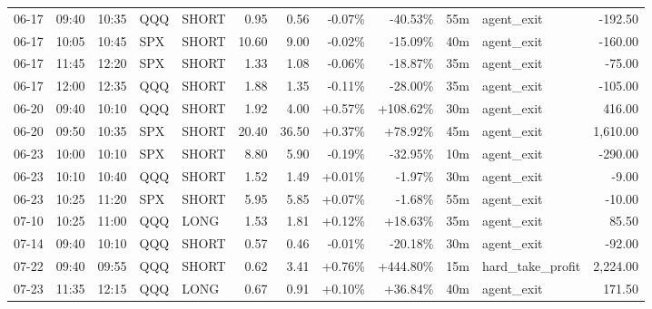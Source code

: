 \documentclass[11pt,a4paper,twoside]{article}
\begin{document}
\begin{center}
\begin{longtable}{>{\color{txtmain}}l l l l l r r r r r >{\color{txtmain}}l r}
06-17 & 09:40 & 10:35 & QQQ & SHORT & 0.95 & 0.56 & \textcolor{lossred}{-0.07\%} & \textcolor{lossred}{-40.53\%} & 55m & agent\_exit & \textcolor{lossred}{-192.50} \\
06-17 & 10:05 & 10:45 & SPX & SHORT & 10.60 & 9.00 & \textcolor{lossred}{-0.02\%} & \textcolor{lossred}{-15.09\%} & 40m & agent\_exit & \textcolor{lossred}{-160.00} \\
06-17 & 11:45 & 12:20 & SPX & SHORT & 1.33 & 1.08 & \textcolor{lossred}{-0.06\%} & \textcolor{lossred}{-18.87\%} & 35m & agent\_exit & \textcolor{lossred}{-75.00} \\
06-17 & 12:00 & 12:35 & QQQ & SHORT & 1.88 & 1.35 & \textcolor{lossred}{-0.11\%} & \textcolor{lossred}{-28.00\%} & 35m & agent\_exit & \textcolor{lossred}{-105.00} \\
06-20 & 09:40 & 10:10 & QQQ & SHORT & 1.92 & 4.00 & \textcolor{wingreen}{+0.57\%} & \textcolor{wingreen}{+108.62\%} & 30m & agent\_exit & \textcolor{wingreen}{416.00} \\
06-20 & 09:50 & 10:35 & SPX & SHORT & 20.40 & 36.50 & \textcolor{wingreen}{+0.37\%} & \textcolor{wingreen}{+78.92\%} & 45m & agent\_exit & \textcolor{wingreen}{1,610.00} \\
06-23 & 10:00 & 10:10 & SPX & SHORT & 8.80 & 5.90 & \textcolor{lossred}{-0.19\%} & \textcolor{lossred}{-32.95\%} & 10m & agent\_exit & \textcolor{lossred}{-290.00} \\
06-23 & 10:10 & 10:40 & QQQ & SHORT & 1.52 & 1.49 & \textcolor{wingreen}{+0.01\%} & \textcolor{lossred}{-1.97\%} & 30m & agent\_exit & \textcolor{lossred}{-9.00} \\
06-23 & 10:25 & 11:20 & SPX & SHORT & 5.95 & 5.85 & \textcolor{wingreen}{+0.07\%} & \textcolor{lossred}{-1.68\%} & 55m & agent\_exit & \textcolor{lossred}{-10.00} \\
07-10 & 10:25 & 11:00 & QQQ & LONG & 1.53 & 1.81 & \textcolor{wingreen}{+0.12\%} & \textcolor{wingreen}{+18.63\%} & 35m & agent\_exit & \textcolor{wingreen}{85.50} \\
07-14 & 09:40 & 10:10 & QQQ & SHORT & 0.57 & 0.46 & \textcolor{lossred}{-0.01\%} & \textcolor{lossred}{-20.18\%} & 30m & agent\_exit & \textcolor{lossred}{-92.00} \\
07-22 & 09:40 & 09:55 & QQQ & SHORT & 0.62 & 3.41 & \textcolor{wingreen}{+0.76\%} & \textcolor{wingreen}{+444.80\%} & 15m & hard\_take\_profit & \textcolor{wingreen}{2,224.00} \\
07-23 & 11:35 & 12:15 & QQQ & LONG & 0.67 & 0.91 & \textcolor{wingreen}{+0.10\%} & \textcolor{wingreen}{+36.84\%} & 40m & agent\_exit & \textcolor{wingreen}{171.50} \\

\end{longtable}
\end{center}
\end{document}
